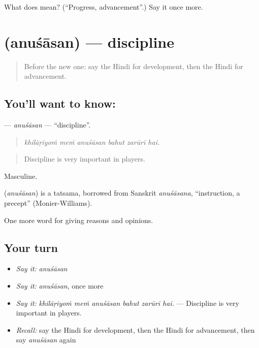 \begin{tcolorbox}[breakable,colback=teal!4,colframe=teal!35!black,title={Before you move on}]
What does  mean? (\textquotedblleft{}Progress, advancement\textquotedblright{}.) Say it once more.
\end{tcolorbox}
\section[\texorpdfstring{\hi{अनुशासन} (anuśāsan)}{अनुशासन (anuśāsan)}]{ (anuśāsan) — discipline}

\label{lesson:HI-C368-anusasan}



\begin{quote}
Before the new one: say the Hindi for development, then the Hindi for advancement.
\end{quote}

\subsection*{You'll want to know: }
\textbf{} — \emph{anuśāsan} — \textquotedblleft{}discipline\textquotedblright{}.

\begin{quote}
     
\end{quote}

\begin{quote}
\emph{khilāṛiyoṁ meṁ anuśāsan bahut zarūrī hai.}
\end{quote}

\begin{quote}
Discipline is very important in players.
\end{quote}

Masculine.

\begin{cousinweb}
\textbf{} (\emph{anuśāsan}) is a tatsama, borrowed from Sanskrit \emph{anuśāsana}, \textquotedblleft{}instruction, a precept\textquotedblright{} (Monier-Williams).
\end{cousinweb}

\begin{grammarlens}[title={What you've built}]
One more word for giving reasons and opinions.
\end{grammarlens}

\subsection*{Your turn}
\begin{itemize}
\raggedright
  \item \emph{Say it:} \emph{anuśāsan}
  \item \emph{Say it:} \emph{anuśāsan}, once more
  \item \emph{Say it:} \emph{khilāṛiyoṁ meṁ anuśāsan bahut zarūrī hai.} — Discipline is very important in players.
  \item \emph{Recall:} say the Hindi for development, then the Hindi for advancement, then say \emph{anuśāsan} again
\end{itemize}

